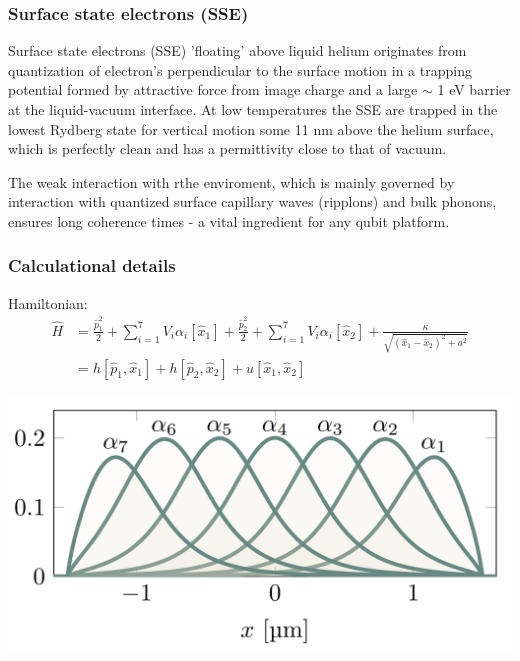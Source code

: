 \documentclass{beamer}
\begin{document}
\begin{frame}
\frametitle{Surface state electrons (SSE)}

\begin{block}{}
Surface state electrons (SSE) 'floating' above liquid helium
originates from quantization of electron's perpendicular to the
surface motion in a trapping potential formed by attractive force from
image charge and a large $\sim$ 1 eV barrier at the liquid-vacuum
interface. At low temperatures the SSE are trapped in the lowest
Rydberg state for vertical motion some 11 nm above the helium surface,
which is perfectly clean and has a permittivity close to that of
vacuum.
\end{block}

\begin{block}{}
The weak interaction with rthe enviroment, which is mainly governed
by interaction with quantized surface capillary waves (ripplons) and
bulk phonons, ensures long coherence times - a vital ingredient for
any qubit platform. 
\end{block}
\end{frame}

\begin{frame}
\frametitle{Calculational details}

Hamiltonian:
\begin{align}
\hat{H} &=\frac{\hat{p}_1^2}{2} + \sum_{i = 1}^7 V_i\alpha_i[\hat{x}_1] + \frac{\hat{p}_2^2}{2} + \sum_{i = 1}^7 V_i\alpha_i[\hat{x}_2] + \frac{\kappa}{\sqrt{(\hat{x}_1-\hat{x}_2)^2 + a^2}}\\
&= h[\hat{p}_1,\hat{x}_1] + h[\hat{p}_2,\hat{x}_2] + u[\hat{x}_1,\hat{x}_2]
\end{align}

\vspace{6mm}

\centerline{\includegraphics[width=0.8\linewidth]{qcfigures/well_basis.png}}

\vspace{6mm}
\end{frame}
\end{document}
